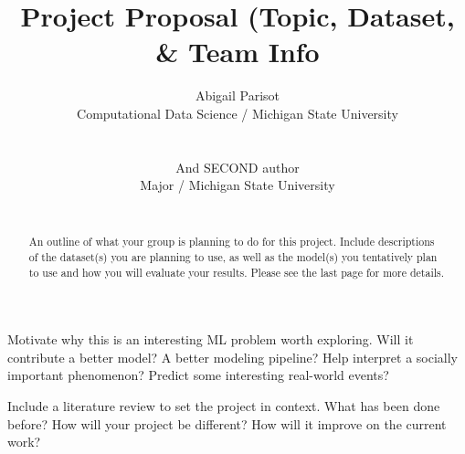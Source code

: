 \title{Project Proposal (Topic, Dataset, & Team Info}
\author {Abigail Parisot \\
	Computational Data Science / Michigan State University \\
	 \\\\And
	SECOND author \\
	Major / Michigan State University \\\
	}
	

\maketitle
\begin{abstract}
An outline of what your group is planning to do for this project. Include descriptions of 
the dataset(s) you are planning to use, as well as the model(s) you tentatively plan to 
use and how you will evaluate your results. Please see the last page for more details.
\end{abstract}

\begin{Introduction}
Motivate why this is an interesting ML problem worth exploring. Will it contribute a 
better model? A better modeling pipeline? Help interpret a socially important 
phenomenon? Predict some interesting real-world events?
\end{Introduction}

\begin{Related Works}
Include a literature review to set the project in context. What has been done before? 
How will your project be different? How will it improve on the current work? 
\end{Related Works}

